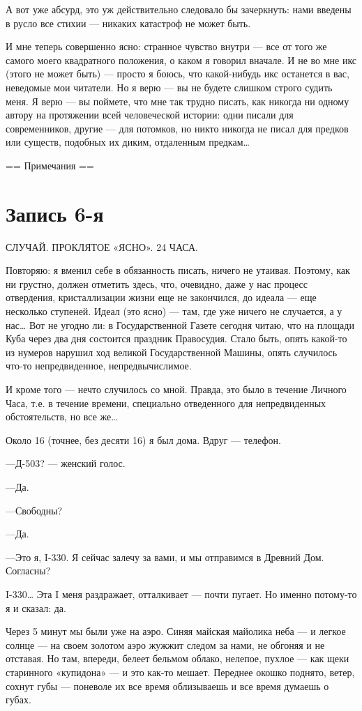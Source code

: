 \documentclass[11pt,openany]{book}
\newcommand{\bookchapterplain}[1]{%
  \clearpage\phantomsection\chapter*{#1}%
  \addcontentsline{toc}{chapter}{#1}\markboth{#1}{#1}\thispagestyle{plain}}
\begin{document}
А вот уже абсурд, это уж действительно следовало бы зачеркнуть: нами введены в русло все стихии --- никаких катастроф не может быть.

И мне теперь совершенно ясно: странное чувство внутри --- все от того же самого моего квадратного положения, о каком я говорил вначале. И не во мне икс (этого не может быть) --- просто я боюсь, что какой-нибудь икс останется в вас, неведомые мои читатели. Но я верю --- вы не будете слишком строго судить меня. Я верю --- вы поймете, что мне так трудно писать, как никогда ни одному автору на протяжении всей человеческой истории: одни писали для современников, другие --- для потомков, но никто никогда не писал для предков или существ, подобных их диким, отдаленным предкам\ldots{}

== Примечания ==

\bookchapterplain{Запись 6-я}

\begin{center}\textsc{СЛУЧАЙ. ПРОКЛЯТОЕ «ЯСНО». 24 ЧАСА.}\end{center}

Повторяю: я вменил себе в обязанность писать, ничего не утаивая. Поэтому, как ни грустно, должен отметить здесь, что, очевидно, даже у нас процесс отвердения, кристаллизации жизни еще не закончился, до идеала --- еще несколько ступеней. Идеал (это ясно) --- там, где уже ничего не случается, а у нас\ldots{} Вот не угодно ли: в Государственной Газете сегодня читаю, что на площади Куба через два дня состоится праздник Правосудия. Стало быть, опять какой-то из нумеров нарушил ход великой Государственной Машины, опять случилось что-то непредвиденное, непредвычислимое.

И кроме того --- нечто случилось со мной. Правда, это было в течение Личного Часа, т.е. в течение времени, специально отведенного для непредвиденных обстоятельств, но все же\ldots{}

Около 16 (точнее, без десяти 16) я был дома. Вдруг --- телефон.

---Д-503? --- женский голос.

---Да.

---Свободны?

---Да.

---Это я, I-330. Я сейчас залечу за вами, и мы отправимся в Древний Дом. Согласны?

I-330\ldots{} Эта I меня раздражает, отталкивает --- почти пугает. Но именно потому-то я и сказал: да.

Через 5 минут мы были уже на аэро. Синяя майская майолика неба --- и легкое солнце --- на своем золотом аэро жужжит следом за нами, не обгоняя и не отставая. Но там, впереди, белеет бельмом облако, нелепое, пухлое --- как щеки старинного «купидона» --- и это как-то мешает. Переднее окошко поднято, ветер, сохнут губы --- поневоле их все время облизываешь и все время думаешь о губах.
\end{document}

